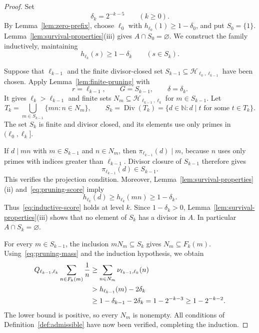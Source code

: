 \documentclass[11pt]{amsart}
\theoremstyle{definition}
\numberwithin{equation}{section}
\newcommand{\N}{\mathbb N}
\newcommand{\Hblock}[2]{\mathcal H_{#1,#2}}
\DeclareMathOperator{\Div}{Div}
\begin{document}
\begin{proof}
Set
\begin{equation}\label{eq:delta}
  \delta_k=2^{-k-5}\qquad(k\geq0).
\end{equation}
By Lemma~\ref{lem:zero-prefix}, choose $\ell_0$ with $h_{\ell_0}(1)\geq1-\delta_0$, and put $S_0=\{1\}$.
Lemma~\ref{lem:survival-properties}\textup{(iii)} gives $A\cap S_0=\varnothing$.
We construct the family inductively, maintaining
\begin{equation}\label{eq:inductive-score}
  h_{\ell_k}(s)\geq1-\delta_k\qquad(s\in S_k).
\end{equation}

Suppose that $\ell_{k-1}$ and the finite divisor-closed set $S_{k-1}\subseteq\Hblock{\ell_0}{\ell_{k-1}}$ have been chosen.
Apply Lemma~\ref{lem:finite-pruning} with
\[
  r=\ell_{k-1},\qquad G=S_{k-1},\qquad\delta=\delta_k.
\]
It gives $\ell_k>\ell_{k-1}$ and finite sets $N_m\subseteq\Hblock{\ell_{k-1}}{\ell_k}$ for $m\in S_{k-1}$.
Let
\begin{equation}\label{eq:construction}
  T_k=\bigcup_{m\in S_{k-1}}\{mn:n\in N_m\},
  \qquad
  S_k=\Div(T_k)=\{d\in\N:d\mid t\text{ for some }t\in T_k\}.
\end{equation}
The set $S_k$ is finite and divisor closed, and its elements use only primes in $(\ell_0,\ell_k]$.

If $d\mid mn$ with $m\in S_{k-1}$ and $n\in N_m$, then
$\pi_{\ell_{k-1}}(d)\mid m$, because $n$ uses only primes with indices greater than $\ell_{k-1}$.
Divisor closure of $S_{k-1}$ therefore gives
\[
  \pi_{\ell_{k-1}}(d)\in S_{k-1}.
\]
This verifies the projection condition.
Moreover, Lemma~\ref{lem:survival-properties}\textup{(ii)} and~\eqref{eq:pruning-score} imply
\[
  h_{\ell_k}(d)\geq h_{\ell_k}(mn)\geq1-\delta_k.
\]
Thus~\eqref{eq:inductive-score} holds at level $k$.
Since $1-\delta_k>0$, Lemma~\ref{lem:survival-properties}\textup{(iii)} shows that no element of $S_k$ has a divisor in $A$.
In particular $A\cap S_k=\varnothing$.

For every $m\in S_{k-1}$, the inclusion $mN_m\subseteq S_k$ gives $N_m\subseteq F_k(m)$.
Using~\eqref{eq:pruning-mass} and the induction hypothesis, we obtain
\begin{align}
  Q_{\ell_{k-1},\ell_k}\sum_{n\in F_k(m)}\frac1n
    &\geq\sum_{n\in N_m}\nu_{\ell_{k-1},\ell_k}(n)\notag\\
    &>h_{\ell_{k-1}}(m)-2\delta_k\notag\\
    &\geq1-\delta_{k-1}-2\delta_k
      =1-2^{-k-3}
      \geq1-2^{-k-2}.\label{eq:budget}
\end{align}
The lower bound is positive, so every $N_m$ is nonempty.
All conditions of Definition~\ref{def:admissible} have now been verified, completing the induction.
\end{proof}
\end{document}
